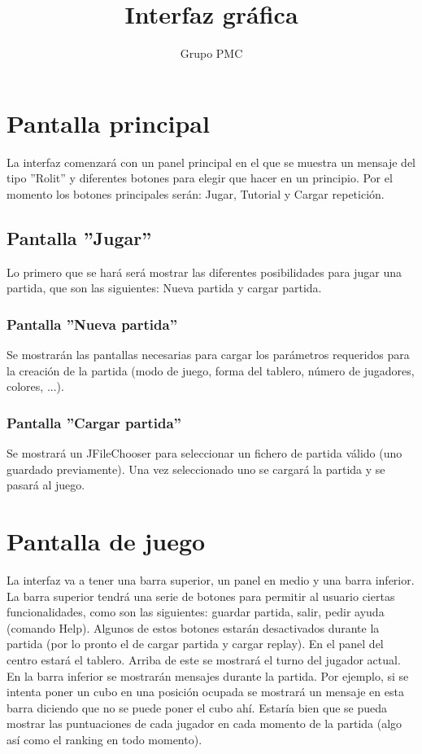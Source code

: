 \documentclass[14pt]{extreport}
\author{Grupo PMC}
\begin{document}
\title{Interfaz gráfica}
\maketitle


\section*{Pantalla principal}
La interfaz comenzará con un panel principal en el que se muestra un mensaje del tipo ''Rolit'' y diferentes botones para elegir que hacer en un principio. Por el momento los botones principales serán: Jugar, Tutorial y Cargar repetición.

\subsection*{Pantalla ''Jugar''}
Lo primero que se hará será mostrar las diferentes posibilidades para jugar una partida, que son las siguientes: Nueva partida y cargar partida.

\subsubsection*{Pantalla ''Nueva partida''}
Se mostrarán las pantallas necesarias para cargar los parámetros requeridos para la creación de la partida (modo de juego, forma del tablero, número de jugadores, colores, ...).

\subsubsection*{Pantalla ''Cargar partida''}
Se mostrará un JFileChooser para seleccionar un fichero de partida válido (uno guardado previamente). Una vez seleccionado uno se cargará la partida y se pasará al juego.

\section*{Pantalla de juego}
La interfaz va a tener una barra superior, un panel en medio y una barra inferior.
La barra superior tendrá una serie de botones para permitir al usuario ciertas funcionalidades, como son las siguientes: guardar partida, salir, pedir ayuda (comando Help). Algunos de estos botones estarán desactivados durante la partida (por lo pronto el de cargar partida y cargar replay).
En el panel del centro estará el tablero. Arriba de este se mostrará el turno del jugador actual.
En la barra inferior se mostrarán mensajes durante la partida. Por ejemplo, si se intenta poner un cubo en una posición ocupada se mostrará un mensaje en esta barra diciendo que no se puede poner el cubo ahí.
Estaría bien que se pueda mostrar las puntuaciones de cada jugador en cada momento de la partida (algo así como el ranking en todo momento).
\end{document}
